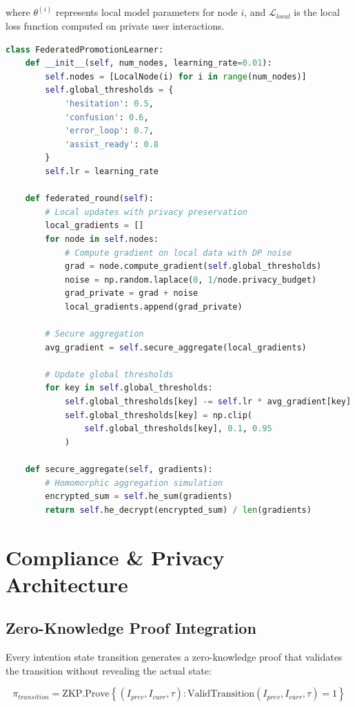 \documentclass[11pt,a4paper]{article}
\begin{document}
where $\theta^{(i)}$ represents local model parameters for node $i$, and $\mathcal{L}_{local}$ is the local loss function computed on private user interactions.

\begin{lstlisting}[language=Python, caption=Federated Threshold Learning]
class FederatedPromotionLearner:
    def __init__(self, num_nodes, learning_rate=0.01):
        self.nodes = [LocalNode(i) for i in range(num_nodes)]
        self.global_thresholds = {
            'hesitation': 0.5,
            'confusion': 0.6,
            'error_loop': 0.7,
            'assist_ready': 0.8
        }
        self.lr = learning_rate
    
    def federated_round(self):
        # Local updates with privacy preservation
        local_gradients = []
        for node in self.nodes:
            # Compute gradient on local data with DP noise
            grad = node.compute_gradient(self.global_thresholds)
            noise = np.random.laplace(0, 1/node.privacy_budget)
            grad_private = grad + noise
            local_gradients.append(grad_private)
        
        # Secure aggregation
        avg_gradient = self.secure_aggregate(local_gradients)
        
        # Update global thresholds
        for key in self.global_thresholds:
            self.global_thresholds[key] -= self.lr * avg_gradient[key]
            self.global_thresholds[key] = np.clip(
                self.global_thresholds[key], 0.1, 0.95
            )
    
    def secure_aggregate(self, gradients):
        # Homomorphic aggregation simulation
        encrypted_sum = self.he_sum(gradients)
        return self.he_decrypt(encrypted_sum) / len(gradients)
\end{lstlisting}

\section{Compliance \& Privacy Architecture}

\subsection{Zero-Knowledge Proof Integration}

Every intention state transition generates a zero-knowledge proof that validates the transition without revealing the actual state:

\begin{equation}
\pi_{transition} = \text{ZKP.Prove}\left\{(I_{prev}, I_{curr}, \tau): \text{ValidTransition}(I_{prev}, I_{curr}, \tau) = 1\right\}
\end{equation}
\end{document}
